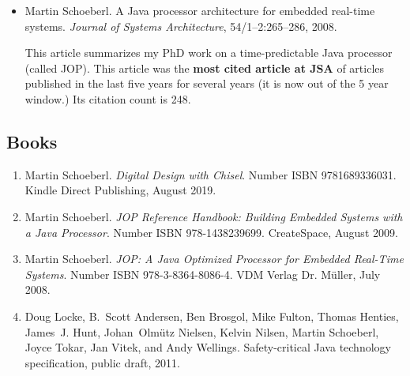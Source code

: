 \documentclass[%
    a4paper,
    11pt, %
    headinclude, footexclude,
    notitlepage,
    headsepline,
    pointlessnumbers,
    ]{scrartcl}
\begin{document}
\begin{itemize}
\item Martin Schoeberl. A Java processor architecture for
embedded real-time systems. {\em Journal of Systems
Architecture}, 54/1--2:265--286, 2008.

This article summarizes my PhD work on a time-predictable Java processor
(called JOP). This article was the \textbf{most cited article at JSA} of articles
published in the last five years for several years (it is now out of the 5 year
window.) Its citation count is 248.


   
%




 
\end{itemize}

\subsection*{Books}

\begin{enumerate}

\item Martin Schoeberl. {\em Digital Design with Chisel}.
Number ISBN 9781689336031. Kindle Direct Publishing, August 2019. 

\item Martin Schoeberl. {\em JOP Reference Handbook: Building
    Embedded Systems with a Java Processor}. Number ISBN
978-1438239699. CreateSpace, August 2009.

\item Martin Schoeberl. {\em JOP: A Java Optimized Processor for
    Embedded Real-Time Systems}. Number ISBN 978-3-8364-8086-4.
    VDM Verlag Dr. M{\"u}ller, July 2008.

\item Doug Locke, B.~Scott Andersen, Ben Brosgol, Mike Fulton, Thomas Henties,
  James~J. Hunt, Johan~Olm\"{u}tz Nielsen, Kelvin Nilsen, Martin Schoeberl,
  Joyce Tokar, Jan Vitek, and Andy Wellings.
 Safety-critical {Java} technology specification, public draft, 2011.

\end{enumerate}
\end{document}
